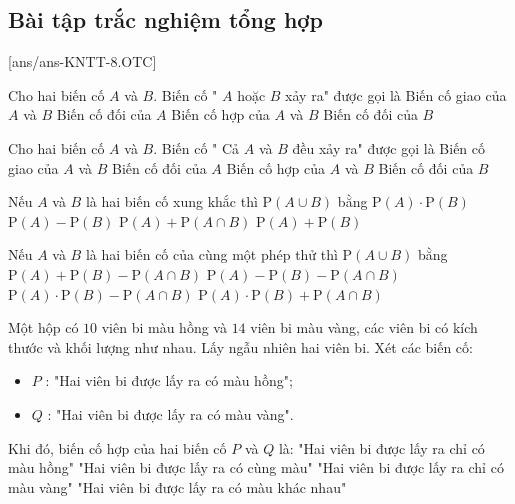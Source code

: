 \subsection{Bài tập trắc nghiệm tổng hợp}
[ans/ans-KNTT-8.OTC]
\begin{ex}
	Cho hai biến cố $A$ và $B$. Biến cố " $A$ hoặc $B$ xảy ra" được gọi là
	\choice
	{Biến cố giao của $A$ và $B$}
	{Biến cố đối của $A$}
	{\True Biến cố hợp của $A$ và $B$}
	{Biến cố đối của $B$}
\end{ex}

\begin{ex}
	Cho hai biến cố $A$ và $B$. Biến cố " Cả $A$ và $B$ đều xảy ra" được gọi là
	\choice
	{\True Biến cố giao của $A$ và $B$}
	{Biến cố đối của $A$}
	{Biến cố hợp của $A$ và $B$}
	{Biến cố đối của $B$}
\end{ex}

\begin{ex}%
	Nếu $A$ và $B$ là hai biến cố xung khắc thì $\mathrm{P}(A \cup B)$ bằng
	\choice
	{ $\mathrm{P}(A)\cdot  \mathrm{P}(B)$}
	{ $\mathrm{P}(A)-\mathrm{P}(B)$}
	{ $\mathrm{P}(A)+\mathrm{P}(A \cap B)$}
	{\True  $\mathrm{P}(A)+\mathrm{P}(B)$}
	\loigiai{}
\end{ex}

\begin{ex}%
	Nếu $A$ và $B$ là hai biến cố của cùng một phép thử thì $\mathrm{P}(A \cup B)$ bằng
	\choice
	{ \True $\mathrm{P}(A)+\mathrm{P}(B)-\mathrm{P}(A \cap B)$}
	{ $\mathrm{P}(A)-\mathrm{P}(B)-\mathrm{P}(A \cap B)$}
	{ $\mathrm{P}(A)\cdot \mathrm{P}(B)-\mathrm{P}(A \cap B)$}
	{ $\mathrm{P}(A) \cdot \mathrm{P}(B)+\mathrm{P}(A \cap B)$}
	\loigiai{}
\end{ex} 

\begin{ex}%
	Một hộp có $10$ viên bi màu hồng và $14$ viên bi màu vàng, các viên bi có kích thước và khối lượng như nhau. Lấy ngẫu nhiên hai viên bi. Xét các biến cố:
	\begin{itemize}
		\item [] $P$ : "Hai viên bi được lấy ra có màu hồng";
		\item [] $Q$ : "Hai viên bi được lấy ra có màu vàng".
	\end{itemize}
	Khi đó, biến cố hợp của hai biến cố $P$ và $Q$ là:
	\choice
	{ "Hai viên bi được lấy ra chỉ có màu hồng"}
	{\True  "Hai viên bi được lấy ra có cùng màu"}
	{ "Hai viên bi được lấy ra chỉ có màu vàng"}
	{ "Hai viên bi được lấy ra có màu khác nhau"}
	\loigiai{}
\end{ex}


